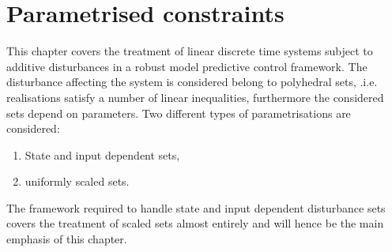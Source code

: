 
\chapter{Parametrised constraints}\label{chapter:parametrised:constraints}
This chapter covers the treatment of linear discrete time systems subject to additive 
disturbances in a robust model predictive control framework.
%
The disturbance affecting the system is considered belong to polyhedral sets, .i.e.
realisations satisfy a number of linear inequalities, furthermore the considered sets 
depend on parameters. 
%
Two different types of parametrisations are considered: 
%
\begin{enumerate}
\item State and input dependent sets,
\item uniformly scaled sets.
\end{enumerate}
%
The framework required to handle state and input dependent disturbance sets covers the 
treatment of scaled sets almost entirely and will hence be the main emphasis of this
chapter. 
%
%
